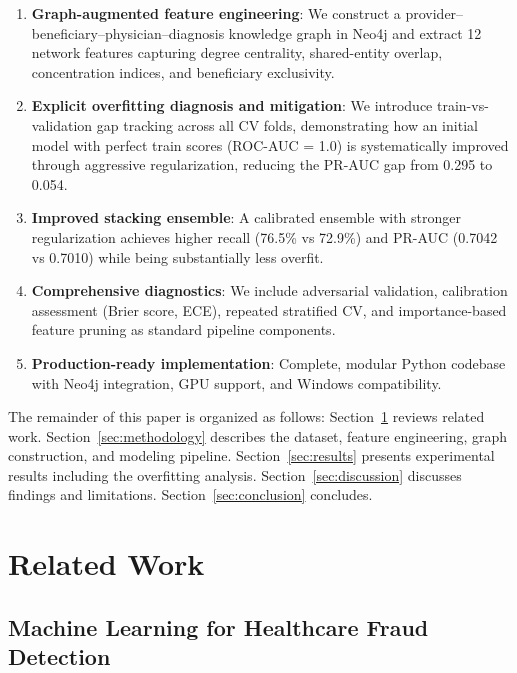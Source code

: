 \documentclass[conference]{IEEEtran}
\begin{document}
\begin{enumerate}[leftmargin=*]
    \item \textbf{Graph-augmented feature engineering}: We construct a provider--beneficiary--physician--diagnosis knowledge graph in Neo4j and extract 12 network features capturing degree centrality, shared-entity overlap, concentration indices, and beneficiary exclusivity.
    \item \textbf{Explicit overfitting diagnosis and mitigation}: We introduce train-vs-validation gap tracking across all CV folds, demonstrating how an initial model with perfect train scores (ROC-AUC = 1.0) is systematically improved through aggressive regularization, reducing the PR-AUC gap from 0.295 to 0.054.
    \item \textbf{Improved stacking ensemble}: A calibrated ensemble with stronger regularization achieves higher recall (76.5\% vs 72.9\%) and PR-AUC (0.7042 vs 0.7010) while being substantially less overfit.
    \item \textbf{Comprehensive diagnostics}: We include adversarial validation, calibration assessment (Brier score, ECE), repeated stratified CV, and importance-based feature pruning as standard pipeline components.
    \item \textbf{Production-ready implementation}: Complete, modular Python codebase with Neo4j integration, GPU support, and Windows compatibility.
\end{enumerate}

The remainder of this paper is organized as follows: Section~\ref{sec:related} reviews related work. Section~\ref{sec:methodology} describes the dataset, feature engineering, graph construction, and modeling pipeline. Section~\ref{sec:results} presents experimental results including the overfitting analysis. Section~\ref{sec:discussion} discusses findings and limitations. Section~\ref{sec:conclusion} concludes.

\section{Related Work}
\label{sec:related}

\subsection{Machine Learning for Healthcare Fraud Detection}
\end{document}
